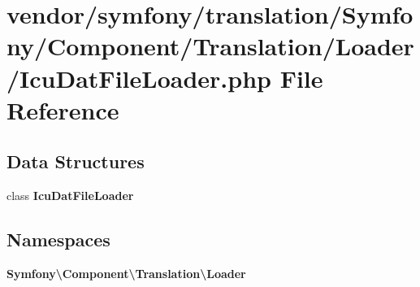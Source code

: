 \section{vendor/symfony/translation/\+Symfony/\+Component/\+Translation/\+Loader/\+Icu\+Dat\+File\+Loader.php File Reference}
\label{_icu_dat_file_loader_8php}
\subsection*{Data Structures}
\begin{DoxyCompactItemize}
\item 
class {\bf Icu\+Dat\+File\+Loader}
\end{DoxyCompactItemize}
\subsection*{Namespaces}
\begin{DoxyCompactItemize}
\item 
 {\bf Symfony\textbackslash{}\+Component\textbackslash{}\+Translation\textbackslash{}\+Loader}
\end{DoxyCompactItemize}
